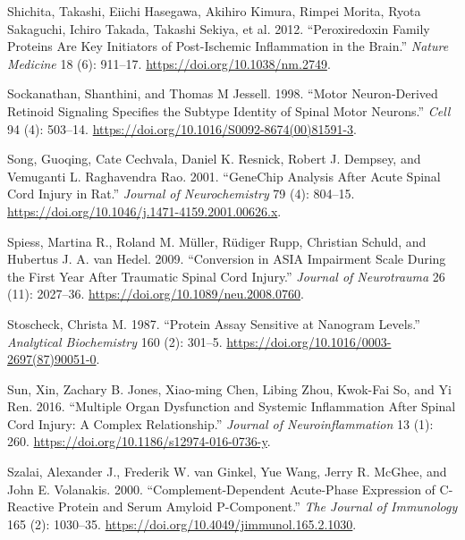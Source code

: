 \documentclass[
]{article}
\newlength{\cslhangindent}
\newlength{\cslentryspacingunit} %
\newenvironment{CSLReferences}[2] %
 {%
  \setlength{\parindent}{0pt}
  \ifodd #1
  \let\oldpar\par
  \def\par{\hangindent=\cslhangindent\oldpar}
  \fi
  \setlength{\parskip}{#2\cslentryspacingunit}
 }%
 {}
\begin{document}
\begin{landscape}
\begin{landscape}
\begin{CSLReferences}{1}{0}
\leavevmode{}%
Shichita, Takashi, Eiichi Hasegawa, Akihiro Kimura, Rimpei Morita, Ryota Sakaguchi, Ichiro Takada, Takashi Sekiya, et al. 2012. {``Peroxiredoxin Family Proteins Are Key Initiators of Post-Ischemic Inflammation in the Brain.''} \emph{Nature Medicine} 18 (6): 911--17. \url{https://doi.org/10.1038/nm.2749}.

\leavevmode{}%
Sockanathan, Shanthini, and Thomas M Jessell. 1998. {``Motor {Neuron-Derived Retinoid Signaling Specifies} the {Subtype Identity} of {Spinal Motor Neurons}.''} \emph{Cell} 94 (4): 503--14. \url{https://doi.org/10.1016/S0092-8674(00)81591-3}.

\leavevmode{}%
Song, Guoqing, Cate Cechvala, Daniel K. Resnick, Robert J. Dempsey, and Vemuganti L. Raghavendra Rao. 2001. {``{GeneChip} Analysis After Acute Spinal Cord Injury in Rat.''} \emph{Journal of Neurochemistry} 79 (4): 804--15. \url{https://doi.org/10.1046/j.1471-4159.2001.00626.x}.

\leavevmode{}%
Spiess, Martina R., Roland M. Müller, Rüdiger Rupp, Christian Schuld, and Hubertus J. A. van Hedel. 2009. {``Conversion in {ASIA Impairment Scale} During the First Year After Traumatic Spinal Cord Injury.''} \emph{Journal of Neurotrauma} 26 (11): 2027--36. \url{https://doi.org/10.1089/neu.2008.0760}.

\leavevmode{}%
Stoscheck, Christa M. 1987. {``Protein Assay Sensitive at Nanogram Levels.''} \emph{Analytical Biochemistry} 160 (2): 301--5. \url{https://doi.org/10.1016/0003-2697(87)90051-0}.

\leavevmode{}%
Sun, Xin, Zachary B. Jones, Xiao-ming Chen, Libing Zhou, Kwok-Fai So, and Yi Ren. 2016. {``Multiple Organ Dysfunction and Systemic Inflammation After Spinal Cord Injury: A Complex Relationship.''} \emph{Journal of Neuroinflammation} 13 (1): 260. \url{https://doi.org/10.1186/s12974-016-0736-y}.

\leavevmode{}%
Szalai, Alexander J., Frederik W. van Ginkel, Yue Wang, Jerry R. McGhee, and John E. Volanakis. 2000. {``Complement-{Dependent Acute-Phase Expression} of {C-Reactive Protein} and {Serum Amyloid P-Component}.''} \emph{The Journal of Immunology} 165 (2): 1030--35. \url{https://doi.org/10.4049/jimmunol.165.2.1030}.


\end{CSLReferences}
\end{landscape}
\end{landscape}
\end{document}
